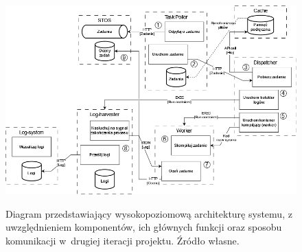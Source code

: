 \begin{figure}[!h]
	\begin{center}
		\resizebox{1.0\textwidth}{!} {
			\includegraphics{img/1/i2_arch.png}
		}
		\caption[Architektura po drugiej iteracji]{Diagram przedstawiający wysokopoziomową architekturę systemu, z uwzględnieniem komponentów, ich głównych funkcji oraz sposobu komunikacji w~drugiej iteracji projektu. Źródło własne.}
		\label{i2}
	\end{center}
\end{figure}

